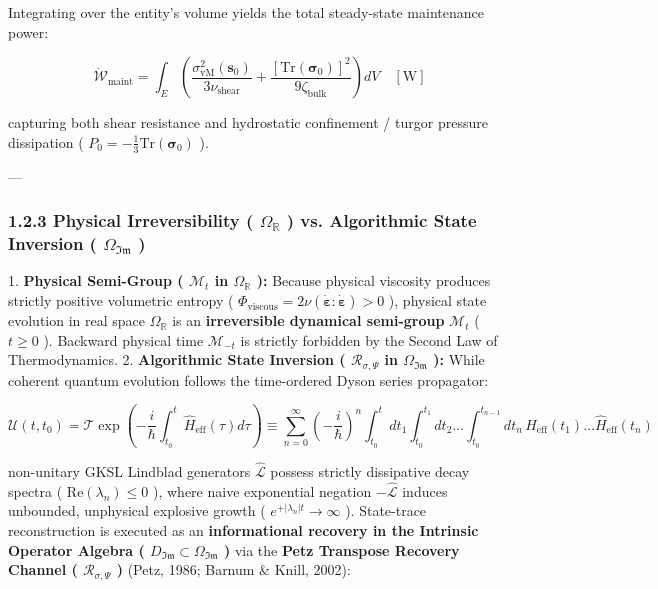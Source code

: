 \documentclass[11pt,a4paper]{article}
\theoremstyle{definition}
\theoremstyle{remark}
\begin{document}
Integrating over the entity's volume yields the total steady-state maintenance power:


\begin{equation}
\boxed{\dot{\mathcal{W}}_{\text{maint}} = \int_E \left( \frac{\sigma_{\mathrm{vM}}^2(\mathbf{s}_0)}{3\nu_{\text{shear}}} + \frac{[ \mathrm{Tr}(\boldsymbol{\sigma}_0) ]^2}{9\zeta_{\text{bulk}}} \right) dV \quad [\mathrm{W}]}
\end{equation}


capturing both shear resistance and hydrostatic confinement / turgor pressure dissipation ( $P_0 = -\frac{1}{3}\mathrm{Tr}(\boldsymbol{\sigma}_0)$ ).

---

\subsubsection{1.2.3 Physical Irreversibility ( $\Omega_{\mathbb{R}}$ ) vs. Algorithmic State Inversion ( $\Omega_{\mathfrak{Im}}$ )}
1. \textbf{Physical Semi-Group ( $\mathcal{M}_t$ in $\Omega_{\mathbb{R}}$ ):}
Because physical viscosity produces strictly positive volumetric entropy ( $\Phi_{\text{viscous}} = 2\nu (\dot{\boldsymbol{\varepsilon}}:\dot{\boldsymbol{\varepsilon}}) > 0$ ), physical state evolution in real space $\Omega_{\mathbb{R}}$ is an \textbf{irreversible dynamical semi-group} $\mathcal{M}_t$ ( $t \ge 0$ ). Backward physical time $\mathcal{M}_{-t}$ is strictly forbidden by the Second Law of Thermodynamics.
2. \textbf{Algorithmic State Inversion ( $\mathcal{R}_{\sigma, \Psi}$ in $\Omega_{\mathfrak{Im}}$ ):}
While coherent quantum evolution follows the time-ordered Dyson series propagator:


\begin{equation}
\mathcal{U}(t, t_0) = \mathcal{T} \exp\left(-\frac{i}{\hbar}\int_{t_0}^t \hat{H}_{\text{eff}}(\tau)d\tau\right) \equiv \sum_{n=0}^\infty \left(-\frac{i}{\hbar}\right)^n \int_{t_0}^t dt_1 \int_{t_0}^{t_1} dt_2 \dots \int_{t_0}^{t_{n-1}} dt_n \, \hat{H}_{\text{eff}}(t_1)\dots\hat{H}_{\text{eff}}(t_n)
\end{equation}


non-unitary GKSL Lindblad generators $\hat{\mathcal{L}}$ possess strictly dissipative decay spectra ( $\mathrm{Re}(\lambda_n) \le 0$ ), where naive exponential negation $-\hat{\mathcal{L}}$ induces unbounded, unphysical explosive growth ( $e^{+|\lambda_n|t} \to \infty$ ). State-trace reconstruction is executed as an \textbf{informational recovery in the Intrinsic Operator Algebra ( $D_{\mathfrak{Im}} \subset \Omega_{\mathfrak{Im}}$ )} via the \textbf{Petz Transpose Recovery Channel ( $\mathcal{R}_{\sigma, \Psi}$ )} (Petz, 1986; Barnum \& Knill, 2002):
\end{document}
